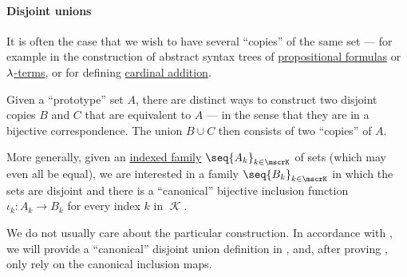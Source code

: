 \paragraph{Disjoint unions}

\begin{remark}\label{rem:disjoint_unions}
  It is often the case that we wish to have several \enquote{copies} of the same set --- for example in the construction of abstract syntax trees of \hyperref[def:propositional_formula_ast]{propositional formulas} or \hyperref[def:lambda_term_ast]{\( {\mathrm \lambda} \)-terms}, or for defining \hyperref[def:cardinal_arithmetic/addition]{cardinal addition}.

  Given a \enquote{prototype} set \( A \), there are distinct ways to construct two disjoint copies \( B \) and \( C \) that are equivalent to \( A \) --- in the sense that they are in a bijective correspondence. The union \( B \cup C \) then consists of two \enquote{copies} of \( A \).

  More generally, given an \hyperref[def:indexed_family]{indexed family} \( \seq{ A_k }_{k \in \mscrK} \) of sets (which may even all be equal), we are interested in a family \( \seq{ B_k }_{k \in \mscrK} \) in which the sets are disjoint and there is a \enquote{canonical} bijective inclusion function \( \iota_k: A_k \to B_k \) for every index \( k \) in \( \mscrK \).

  We do not usually care about the particular construction. In accordance with , we will provide a \enquote{canonical} disjoint union definition in , and, after proving , only rely on the canonical inclusion maps.
\end{remark}

